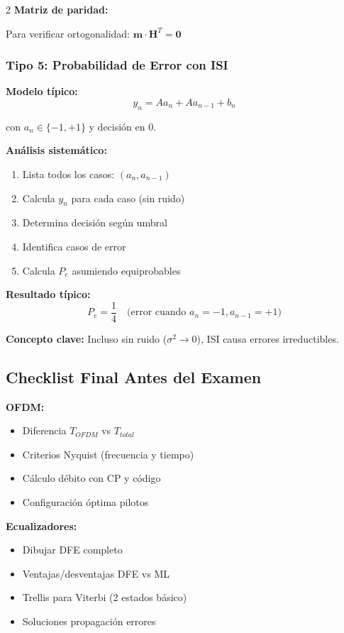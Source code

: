 \documentclass[10pt,a4paper]{article}
\begin{document}
\begin{multicols}{2}
\textbf{Matriz de paridad:}

Para verificar ortogonalidad: $\mathbf{m} \cdot \mathbf{H}^T = \mathbf{0}$

\subsubsection{Tipo 5: Probabilidad de Error con ISI}

\textbf{Modelo típico:}
$$y_n = Aa_n + Aa_{n-1} + b_n$$

con $a_n \in \{-1, +1\}$ y decisión en 0.

\textbf{Análisis sistemático:}
\begin{enumerate}
\item Lista todos los casos: $(a_n, a_{n-1})$
\item Calcula $y_n$ para cada caso (sin ruido)
\item Determina decisión según umbral
\item Identifica casos de error
\item Calcula $P_e$ asumiendo equiprobables
\end{enumerate}

\textbf{Resultado típico:}
$$P_e = \frac{1}{4} \quad \text{(error cuando } a_n=-1, a_{n-1}=+1)$$

\textbf{Concepto clave:} Incluso sin ruido ($\sigma^2 \to 0$), ISI causa errores irreductibles.

\subsection{Checklist Final Antes del Examen}

\begin{tcolorbox}[colback=verdeclaro!10,colframe=azuloscuro,title=Verifica que sabes]

\textbf{OFDM:}
\begin{itemize}
\item[$\square$] Diferencia $T_{OFDM}$ vs $T_{total}$
\item[$\square$] Criterios Nyquist (frecuencia y tiempo)
\item[$\square$] Cálculo débito con CP y código
\item[$\square$] Configuración óptima pilotos
\end{itemize}

\textbf{Ecualizadores:}
\begin{itemize}
\item[$\square$] Dibujar DFE completo
\item[$\square$] Ventajas/desventajas DFE vs ML
\item[$\square$] Trellis para Viterbi (2 estados básico)
\item[$\square$] Soluciones propagación errores
\end{itemize}


\end{tcolorbox}
\end{multicols}
\end{document}

